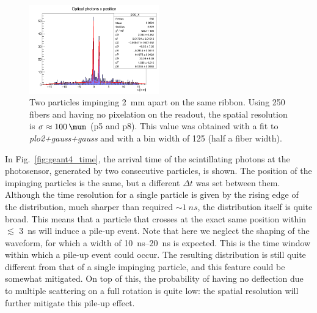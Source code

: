 \begin{refsection}
\begin{figure}
    \centering
    \includegraphics[width=0.5\textwidth]{Figures/muEDM/Tracker/2mm.png}
    \caption{Two particles impinging \SI{2}{mm} apart on the same ribbon. Using \SI{250}{\mum} fibers and having no pixelation on the readout, the spatial resolution is $\sigma\approx \SI{100}{\mum}$ (p5 and p8). This value was obtained with a fit to \textit{plo2+gauss+gauss} and with a bin width of \SI{125}{\mum} (half a fiber width).}
    \label{fig:geant4_position_resolution}
\end{figure}
    
In Fig.~\ref{fig:geant4_time}, the arrival time of the scintillating photons at the photosensor, generated by two consecutive particles, is shown. The position of the impinging particles is the same, but a different $\Delta t$ was set between them. Although the time resolution for a single particle is given by the rising edge of the distribution, much sharper than required $\sim \SI{1}{ns}$, the distribution itself is quite broad. This means that a particle that crosses at the exact same position within $\lesssim$ \SI{3}{ns} will induce a pile-up event. Note that here we neglect the shaping of the waveform, for which a width of \SIrange{10}{20}{ns} is expected. This is the time window within which a pile-up event could occur. The resulting distribution is still quite different from that of a single impinging particle, and this feature could be somewhat mitigated. On top of this, the probability of having no deflection due to multiple scattering on a full rotation is quite low: the spatial resolution will further mitigate this pile-up effect. 


\end{refsection}
